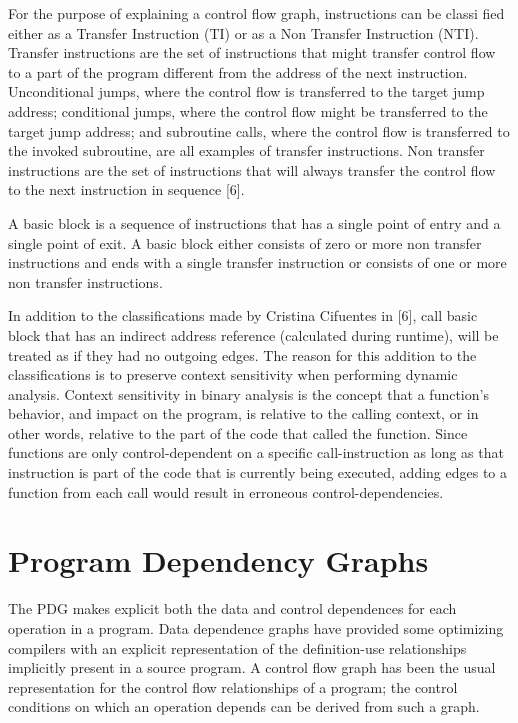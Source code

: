 For the purpose of explaining a control flow graph, instructions can be classi fied either as a Transfer Instruction (TI) or as a Non Transfer Instruction (NTI). Transfer instructions are the set of instructions that might transfer control flow to a part of the program different from the address of the next instruction. Unconditional jumps, where the control flow is transferred to the
target jump address; conditional jumps, where the control flow might be transferred to the target jump address; and subroutine calls, where the control flow is transferred to the invoked subroutine, are all examples of transfer instructions. Non transfer instructions are the set of instructions that will always transfer the control flow to the next instruction in sequence [6].

A basic block is a sequence of instructions that has a single point of entry and a single point of exit. A basic block either consists of zero or more non transfer instructions and ends with a single transfer instruction or consists of one or more non transfer instructions.

In addition to the classifications made by Cristina Cifuentes in [6], call basic block that has an indirect address reference (calculated during runtime), will be treated as if they had no outgoing edges. The reason for this addition to the classifications is to preserve context sensitivity when performing dynamic analysis. Context sensitivity in binary analysis is the concept that a function’s
behavior, and impact on the program, is relative to the calling context, or in other words, relative to the part of the code that called the function. Since functions are only control-dependent on a specific call-instruction as long as that instruction is part of the code that is currently being executed, adding edges to a function from each call would result in erroneous control-dependencies.

\section{Program Dependency Graphs}

The PDG makes explicit both the data and control dependences for each operation in a program. Data dependence graphs have provided some optimizing compilers with an explicit representation of the definition-use relationships implicitly present in a source program. A control flow graph has been the usual representation for the control flow relationships of a program; the control conditions on which an operation depends can be derived from such a graph.

